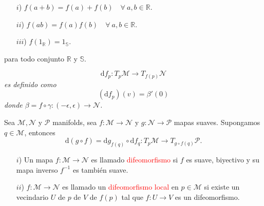 \documentclass[../main]{subfiles}
\begin{document}

\begin{enumerate}
    \item[$i$)] $f(a+b)=f(a)+f(b) \quad \forall \ a,b \in \mathbb{R}$.
    \item[$ii$)] $f(ab)=f(a)f(b)\quad \forall \ a,b \in \mathbb{R}$.
    \item[$iii$)] $f(1_{\mathbb{R}})=1_{\mathbb{S}}$.  
\end{enumerate}
para todo conjunto $\mathbb{R}$ y $\mathbb{S}$.

\begin{equation}
    \mathrm{d}f_p: T_p\mathcal{M}\rightarrow T_{f(p)}\mathcal{N}
\end{equation}
\textit{es definido como} 
\begin{equation}
    (\mathrm{d}f_p)(v)=\beta'(0)
\end{equation}
\textit{donde $\beta=f \circ \gamma:(-\epsilon, \epsilon)\rightarrow \mathcal{N}$.}

\proposicion{} Sea $\mathcal{M}, \mathcal{N}$ y $\mathcal{P}$ manifolds, sea $f: \mathcal{M}\rightarrow \mathcal{N}$ y $g:\mathcal{N}\rightarrow \mathcal{P}$ mapas suaves. Supongamos $q\in \mathcal{M}$, entonces 
\begin{equation}
    \mathrm{d}(g\circ f)=\mathrm{d}g_{f(q)}\circ \mathrm{d}f_q: T_p \mathcal{M}\rightarrow T_{g \circ f(q)} \mathcal{P}.
\end{equation}


\begin{enumerate}
    \item[$i$)] Un mapa $f: \mathcal{M}\rightarrow \mathcal{N}$ es llamado \textcolor{red}{difeomorfismo} si $f$ es suave, biyectivo y su mapa inverso $f^{-1}$ es también suave.
    \item[$ii$)] $f: \mathcal{M}\rightarrow \mathcal{N}$ es llamado un \textcolor{red}{difeomorfismo local} en $p \in \mathcal{M}$ si existe un vecindario $U$ de $p$ de $V$ de $f(p)$ tal que $f: U\rightarrow V$ es un difeomorfismo.  
\end{enumerate}
\end{document}
